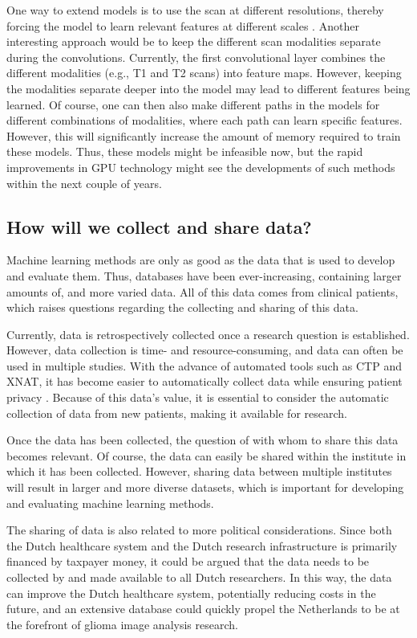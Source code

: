 One way to extend models is to use the scan at different resolutions, thereby forcing the model to learn relevant features at different scales \autocite{akkus20171p19q}.
Another interesting approach would be to keep the different scan modalities separate during the convolutions.
Currently, the first convolutional layer combines the different modalities (e.g., \acrlong{T1} and \acrlong{T2} scans) into feature maps.
However, keeping the modalities separate deeper into the model may lead to different features being learned.
Of course, one can then also make different paths in the models for different combinations of modalities, where each path can learn specific features.
However, this will significantly increase the amount of memory required to train these models.
Thus, these models might be infeasible now, but the rapid improvements in GPU technology might see the developments of such methods within the next couple of years.



\subsection{How will we collect and share data?}

Machine learning methods are only as good as the data that is used to develop and evaluate them.
Thus, databases have been ever-increasing, containing larger amounts of, and more varied data.
All of this data comes from clinical patients, which raises questions regarding the collecting and sharing of this data.

Currently, data is retrospectively collected once a research question is established.
However, data collection is time- and resource-consuming, and data can often be used in multiple studies.
With the advance of automated tools such as CTP and XNAT, it has become easier to automatically collect data while ensuring patient privacy \autocite{marcus2007xnat}.
Because of this data's value, it is essential to consider the automatic collection of data from new patients, making it available for research.

Once the data has been collected, the question of with whom to share this data becomes relevant.
Of course, the data can easily be shared within the institute in which it has been collected.
However, sharing data between multiple institutes will result in larger and more diverse datasets, which is important for developing and evaluating machine learning methods.

The sharing of data is also related to more political considerations.
Since both the Dutch healthcare system and the Dutch research infrastructure is primarily financed by taxpayer money, it could be argued that the data needs to be collected by and made available to all Dutch researchers.
In this way, the data can improve the Dutch healthcare system, potentially reducing costs in the future, and an extensive database could quickly propel the Netherlands to be at the forefront of glioma image analysis research.

